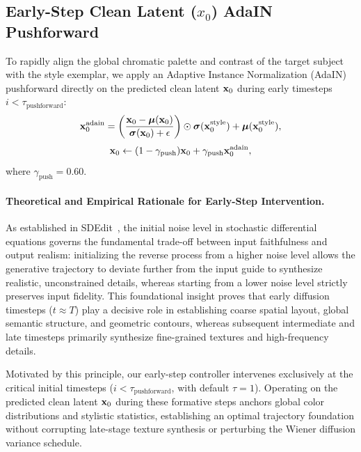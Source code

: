 \subsection{Early-Step Clean Latent ($x_0$) AdaIN Pushforward}
\label{subsec:adain}
To rapidly align the global chromatic palette and contrast of the target subject with the style exemplar, we apply an Adaptive Instance Normalization (AdaIN)~\cite{AdaIn} pushforward directly on the predicted clean latent $\mathbf{x}_0$ during early timesteps $i < \tau_{\text{pushforward}}$:
\begin{equation}
    \mathbf{x}_0^{\text{adain}} = \left( \frac{\mathbf{x}_0 - \boldsymbol{\mu}(\mathbf{x}_0)}{\boldsymbol{\sigma}(\mathbf{x}_0) + \epsilon} \right) \odot \boldsymbol{\sigma}(\mathbf{x}_0^{\text{style}}) + \boldsymbol{\mu}(\mathbf{x}_0^{\text{style}}),
\end{equation}
\begin{equation}
    \mathbf{x}_0 \leftarrow (1 - \gamma_{\text{push}}) \mathbf{x}_0 + \gamma_{\text{push}} \mathbf{x}_0^{\text{adain}},
\end{equation}
where $\gamma_{\text{push}} = 0.60$.

\paragraph{Theoretical and Empirical Rationale for Early-Step Intervention.}
As established in SDEdit~\cite{sdedit}, the initial noise level in stochastic differential equations governs the fundamental trade-off between input faithfulness and output realism: initializing the reverse process from a higher noise level allows the generative trajectory to deviate further from the input guide to synthesize realistic, unconstrained details, whereas starting from a lower noise level strictly preserves input fidelity. This foundational insight proves that early diffusion timesteps ($t \approx T$) play a decisive role in establishing coarse spatial layout, global semantic structure, and geometric contours, whereas subsequent intermediate and late timesteps primarily synthesize fine-grained textures and high-frequency details. 

Motivated by this principle, our early-step controller intervenes exclusively at the critical initial timesteps ($i < \tau_{\text{pushforward}}$, with default $\tau = 1$). Operating on the predicted clean latent $\mathbf{x}_0$ during these formative steps anchors global color distributions and stylistic statistics, establishing an optimal trajectory foundation without corrupting late-stage texture synthesis or perturbing the Wiener diffusion variance schedule.

